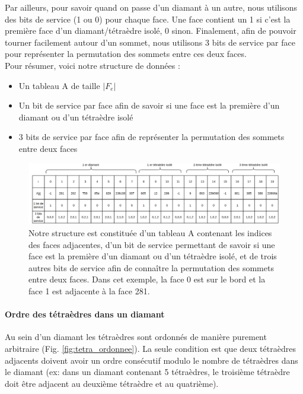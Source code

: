 Par ailleurs, pour savoir quand on passe d'un diamant à un autre, nous utilisons des bits de service (1 ou 0) pour chaque face. Une face contient un 1 si c'est la première face d'un diamant/tétraèdre isolé, 0 sinon. Finalement, afin de pouvoir tourner facilement autour d'un sommet, nous utilisons 3 bits de service par face pour représenter la permutation des sommets entre ces deux faces.\\
Pour résumer, voici notre structure de données :
\begin{itemize}
\item Un tableau A de taille $|F_e|$
\item Un bit de service par face afin de savoir si une face est la première d'un diamant ou d'un tétraèdre isolé
\item 3 bits de service par face afin de représenter la permutation des sommets entre deux faces
\end{itemize}
\begin{figure}[th]
\begin{center}
\includegraphics[scale=0.35]{Images/structure}
\caption{Notre structure est constituée d'un tableau A contenant les indices des faces adjacentes, d'un bit de service permettant de savoir si une face est la première d'un diamant ou d'un tétraèdre isolé, et de trois autres bits de service afin de connaître la permutation des sommets entre deux faces. Dans cet exemple, la face 0 est sur le bord et la face 1 est adjacente à la face 281.}
\label{fig:structure}
\end{center}
\end{figure}

\paragraph{Ordre des tétraèdres dans un diamant}
Au sein d'un diamant les tétraèdres sont ordonnés de manière purement arbitraire (Fig. \ref{fig:tetra_ordonnee}). La seule condition est que deux tétraèdres adjacents doivent avoir un ordre consécutif modulo le nombre de tétraèdres dans le diamant (ex: dans un diamant contenant 5 tétraèdres, le troisième tétraèdre doit être adjacent au deuxième tétraèdre et au quatrième).
